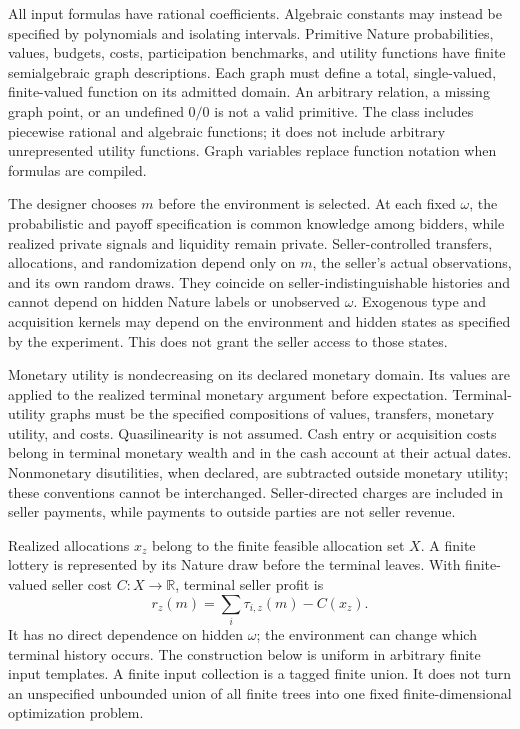 \documentclass[11pt,a4paper]{article}
\numberwithin{equation}{section}
\theoremstyle{definition}
\newcommand{\R}{\mathbb R}
\begin{document}
All input formulas have rational coefficients.
Algebraic constants may instead be specified by polynomials and
isolating intervals.
Primitive Nature probabilities, values, budgets, costs, participation
benchmarks, and utility functions have finite semialgebraic graph
descriptions. Each graph must define a total, single-valued,
finite-valued function on its admitted domain.
An arbitrary relation, a missing graph point, or an undefined
\(0/0\) is not a valid primitive.
The class includes piecewise rational and algebraic functions; it does
not include arbitrary unrepresented utility functions.
Graph variables replace function notation when formulas are compiled.

The designer chooses \(m\) before the environment is selected.
At each fixed \(\omega\), the probabilistic and payoff specification
is common knowledge among bidders, while realized private signals and
liquidity remain private.
Seller-controlled transfers, allocations, and randomization depend only
on \(m\), the seller's actual observations, and its own random draws.
They coincide on seller-indistinguishable histories and cannot depend
on hidden Nature labels or unobserved \(\omega\).
Exogenous type and acquisition kernels may depend on the environment
and hidden states as specified by the experiment.
This does not grant the seller access to those states.

Monetary utility is nondecreasing on its declared monetary domain.
Its values are applied to the realized terminal monetary argument before
expectation. Terminal-utility graphs must be the specified compositions
of values, transfers, monetary utility, and costs.
Quasilinearity is not assumed.
Cash entry or acquisition costs belong in terminal monetary wealth and
in the cash account at their actual dates.
Nonmonetary disutilities, when declared, are subtracted outside monetary
utility; these conventions cannot be interchanged.
Seller-directed charges are included in seller payments, while payments
to outside parties are not seller revenue.

Realized allocations \(x_z\) belong to the finite feasible allocation
set \(X\). A finite lottery is represented by its Nature draw before
the terminal leaves.
With finite-valued seller cost \(C:X\to\R\), terminal seller profit is
\begin{equation}\label{eq:sellerleaf}
 r_z(m)=\sum_i\tau_{i,z}(m)-C(x_z).
\end{equation}
It has no direct dependence on hidden \(\omega\); the environment can
change which terminal history occurs.
The construction below is uniform in arbitrary finite input templates.
A finite input collection is a tagged finite union.
It does not turn an unspecified unbounded union of all finite trees
into one fixed finite-dimensional optimization problem.
\end{document}
